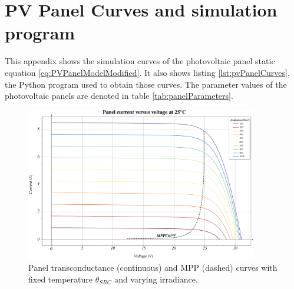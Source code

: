 \chapter{PV Panel Curves and simulation program} \label{ap:pvPanelCurves}

	This appendix shows the simulation curves of the photovoltaic panel static equation \eqref{eq:PVPanelModelModified}. It also shows listing \ref{lst:pvPanelCurves}, the Python program used to obtain those curves. The parameter values of the photovoltaic panels are denoted in table \ref{tab:panelParameters}.

\begin{figure}[h]
	\centering
	\includegraphics[angle = -90, width = 0.9\textwidth]{../images/pvPanelCurves/ivCurve.pdf}
	\caption{Panel transconductance (continuous) and MPP (dashed) curves with fixed temperature $\theta_{SRC}$ and varying irradiance.}
	\label{fig:ivCurve}
\end{figure}

	
